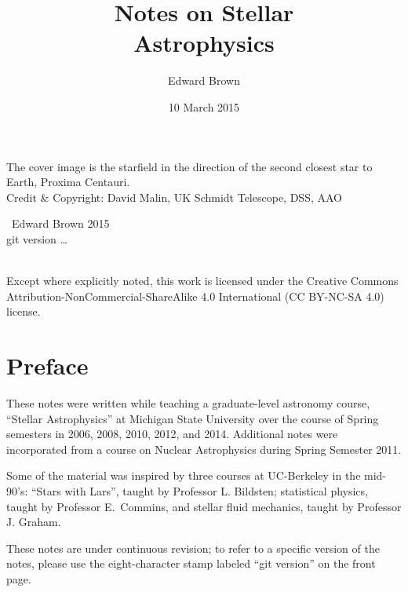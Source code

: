 \documentclass[nofonts,ls]{tufte-book}
\title{Notes on Stellar\\Astrophysics}
\author{Edward Brown}
\date{10 March 2015}
\begin{document}
\frontmatter
{}
\maketitle
\newpage
\begin{fullwidth}
\thispagestyle{empty}

\vspace{3\baselineskip}
\noindent The cover image is the starfield in the direction of the second closest star to Earth, Proxima Centauri.\\
\noindent Credit \& Copyright: David Malin, UK Schmidt Telescope, DSS, AAO

\vfill
\noindent \ccCopy\ Edward Brown 2015\\
\noindent git version \ldots

\vspace{3\baselineskip}
\noindent \ccbyncsa \\
\noindent Except where explicitly noted, this work is licensed under the Creative Commons
Attribution-NonCommercial-ShareAlike 4.0 International (CC BY-NC-SA
4.0) license.

\end{fullwidth}

\newpage
\section*{Preface}
These notes were written while teaching a graduate-level astronomy course, ``Stellar Astrophysics'' at Michigan State University over the course of Spring semesters in 2006, 2008, 2010, 2012, and 2014.  Additional notes were incorporated from a course on Nuclear Astrophysics during Spring Semester 2011.

Some of the material was inspired by three courses at UC-Berkeley in the mid-90's: ``Stars with Lars'', taught by Professor L. Bildsten; statistical physics, taught by Professor E.~Commins, and stellar fluid mechanics, taught by Professor J. Graham.

These notes are under continuous revision; to refer to a specific version of the notes, please use the eight-character stamp labeled ``git version'' on the front page.

\tableofcontents
\listoffigures

\mainmatter

















\appendix


\backmatter


\end{document}
